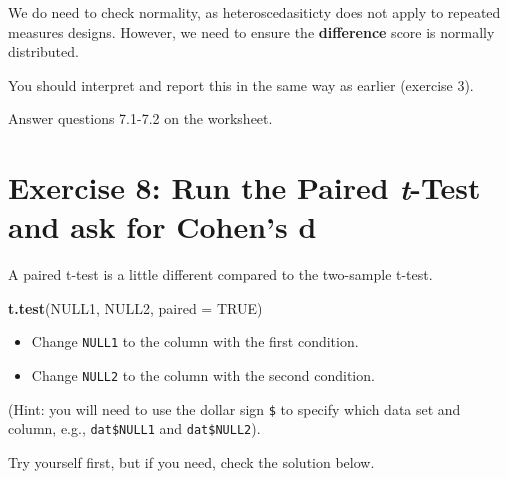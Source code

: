 \documentclass[
]{book}
\newenvironment{Shaded}{\begin{snugshade}}{\end{snugshade}}
\newcommand{\AttributeTok}[1]{\textcolor[rgb]{0.13,0.29,0.53}{#1}}
\newcommand{\CommentTok}[1]{\textcolor[rgb]{0.56,0.35,0.01}{\textit{#1}}}
\newcommand{\ConstantTok}[1]{\textcolor[rgb]{0.56,0.35,0.01}{#1}}
\newcommand{\FunctionTok}[1]{\textcolor[rgb]{0.13,0.29,0.53}{\textbf{#1}}}
\newcommand{\NormalTok}[1]{#1}
\newcommand{\OtherTok}[1]{\textcolor[rgb]{0.56,0.35,0.01}{#1}}
\newcommand{\SpecialCharTok}[1]{\textcolor[rgb]{0.81,0.36,0.00}{\textbf{#1}}}
\let\oldsection\section
\renewcommand{\section}{\needspace{5\baselineskip}\oldsection}
\begin{document}
We do need to check normality, as heteroscedasiticty does not apply to repeated measures designs. However, we need to ensure the \textbf{difference} score is normally distributed.

\begin{Shaded}
\end{Shaded}

You should interpret and report this in the same way as earlier (exercise 3).

Answer questions 7.1-7.2 on the worksheet.

\section{\texorpdfstring{Exercise 8: Run the Paired \emph{t}-Test and ask for Cohen's d}{Exercise 8: Run the Paired t-Test and ask for Cohen's d}}\label{exercise-8-run-the-paired-t-test-and-ask-for-cohens-d}

A paired t-test is a little different compared to the two-sample t-test.

\begin{Shaded}
\begin{Highlighting}[]
\FunctionTok{t.test}\NormalTok{(NULL1, NULL2, }\AttributeTok{paired =} \ConstantTok{TRUE}\NormalTok{)}
\end{Highlighting}
\end{Shaded}

\begin{itemize}
\item
  Change \texttt{NULL1} to the column with the first condition.
\item
  Change \texttt{NULL2} to the column with the second condition.
\end{itemize}

(Hint: you will need to use the dollar sign \texttt{\$} to specify which data set and column, e.g., \texttt{dat\$NULL1} and \texttt{dat\$NULL2}).

Try yourself first, but if you need, check the solution below.
\end{document}
